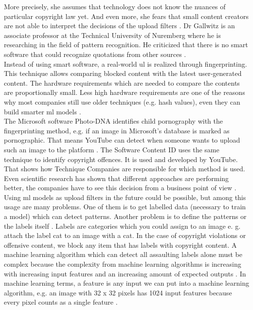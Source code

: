 More precisely, she assumes that technology does not know the nuances of particular copyright law yet. And even more, she fears that small content creators are not able to interpret the decisions of the upload filters \cite{Reda2019}. Dr Gallwitz is an associate professor at the Technical University of Nuremberg where he is researching in the field of pattern recognition. He criticized that there is no smart software that could recognize quotations from other sources \cite{Gallwitz2019}.\\

Instead of using smart software, a real-world \gls{ul} is realized through fingerprinting. This technique allows comparing blocked content with the latest user-generated content. The hardware requirements which are needed to compare the contents are proportionally small. Less high hardware requirements are one of the reasons why most companies still use older techniques (e.g. hash values), even they can build smarter \gls{ml} models \cite{Spoerri2019} \cite{Wagner1983}.\\

The Microsoft software Photo-DNA identifies child pornography with the fingerprinting method, e.g. if an image in Microsoft's database is marked as pornographic. That means YouTube can detect when someone wants to upload such an image to the platform \cite{Microsoft2013}. The Software Content ID uses the same technique to identify copyright offences. It is used and developed by YouTube. That shows how Technique Companies are responsible for which method is used. Even scientific research has shown that different approaches are performing better, the companies have to see this decision from a business point of view \cite{YouTube2010}.\\

Using \gls{ml} models as upload filters in the future could be possible, but among this usage are many problems. One of them is to get labelled data (necessary to train a model) which can detect patterns. Another problem is to define the patterns or the labels itself \cite{WaltermannHubertus2019}. Labels are categories which you could assign to an image \cite{Goodfellow-et-al-2016} e. g. attach the label cat to an image with a cat. In the case of copyright violations or offensive content, we block any item that has labels with copyright content. A machine learning algorithm which can detect all assaulting labels alone must be complex because the complexity from machine learning algorithms is increasing with increasing input features and an increasing amount of expected outputs \cite{Yao2017}. In machine learning terms, a feature is any input we can put into a machine learning algorithm, e.g. an image with 32 x 32 pixels has 1024 input features because every pixel counts as a single feature \cite{Goodfellow-et-al-2016}.

